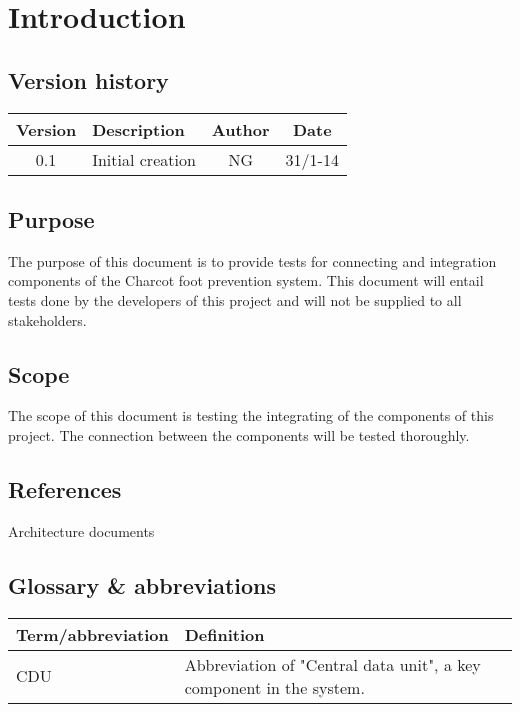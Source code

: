\chapter{Introduction}
\section{Version history}
\begin{table}[H]
\begin{tabular}{|c|p{9cm}|c|c|}
\hline
Version & Description & Author & Date\\ \hline
0.1 & Initial creation & NG & 31/1-14 \\
\hline
\end{tabular}
\end{table}

\section{Purpose}
The purpose of this document is to provide tests for connecting and integration components of the Charcot foot prevention system. This document will entail tests done by the developers of this project and will not be supplied to all stakeholders.

\section{Scope}
The scope of this document is testing the integrating of the components of this project. The connection between the components will be tested thoroughly. 

\section{References}
Architecture documents

\section{Glossary \& abbreviations}
\begin{table}[H]
\centering
\begin{tabular}{|p{4cm}|p{7cm}|}
\hline
Term/abbreviation & Definition\\ \hline
CDU & Abbreviation of "Central data unit", a key component in the system. \\ \hline
\end{tabular}
\end{table}
